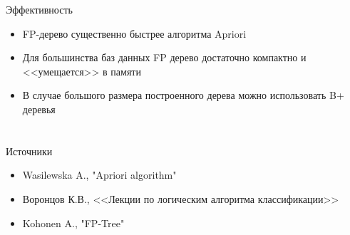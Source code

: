 \documentclass[compress,red]{beamer}
\begin{document}
\begin{frame}{Эффективность}
\begin{itemize}
	\item FP-дерево существенно быстрее алгоритма Apriori
	\item Для большинства баз данных FP дерево достаточно компактно и <<умещается>> в памяти
	\item В случае большого размера построенного дерева можно использовать B+ деревья
\end{itemize}
\end{frame}

\section{}

\begin{frame}{Источники}
\begin{itemize}
	\item Wasilewska A., "Apriori algorithm"
	\item Воронцов К.В., <<Лекции по логическим алгоритма классификации>>
	\item Kohonen A., "FP-Tree"
\end{itemize}
\end{frame}
\end{document}
